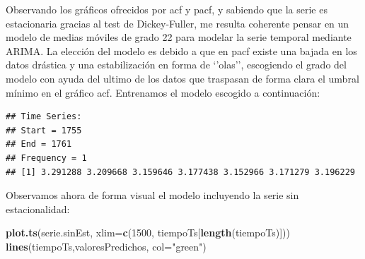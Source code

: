 \documentclass[]{article}
\newenvironment{Shaded}{\begin{snugshade}}{\end{snugshade}}
\newcommand{\KeywordTok}[1]{\textcolor[rgb]{0.13,0.29,0.53}{\textbf{#1}}}
\newcommand{\DataTypeTok}[1]{\textcolor[rgb]{0.13,0.29,0.53}{#1}}
\newcommand{\DecValTok}[1]{\textcolor[rgb]{0.00,0.00,0.81}{#1}}
\newcommand{\StringTok}[1]{\textcolor[rgb]{0.31,0.60,0.02}{#1}}
\newcommand{\CommentTok}[1]{\textcolor[rgb]{0.56,0.35,0.01}{\textit{#1}}}
\newcommand{\OperatorTok}[1]{\textcolor[rgb]{0.81,0.36,0.00}{\textbf{#1}}}
\newcommand{\NormalTok}[1]{#1}
\begin{document}
Observando los gráficos ofrecidos por acf y pacf, y sabiendo que la
serie es estacionaria gracias al test de Dickey-Fuller, me resulta
coherente pensar en un modelo de medias móviles de grado 22 para modelar
la serie temporal mediante ARIMA. La elección del modelo es debido a que
en pacf existe una bajada en los datos drástica y una estabilización en
forma de `'olas'', escogiendo el grado del modelo con ayuda del ultimo
de los datos que traspasan de forma clara el umbral mínimo en el gráfico
acf. Entrenamos el modelo escogido a continuación:

\begin{Shaded}
\end{Shaded}

\begin{verbatim}
## Time Series:
## Start = 1755 
## End = 1761 
## Frequency = 1 
## [1] 3.291288 3.209668 3.159646 3.177438 3.152966 3.171279 3.196229
\end{verbatim}

Observamos ahora de forma visual el modelo incluyendo la serie sin
estacionalidad:

\begin{Shaded}
\begin{Highlighting}[]
\KeywordTok{plot.ts}\NormalTok{(serie.sinEst, }\DataTypeTok{xlim=}\KeywordTok{c}\NormalTok{(}\DecValTok{1500}\NormalTok{, tiempoTs[}\KeywordTok{length}\NormalTok{(tiempoTs)])) }
\KeywordTok{lines}\NormalTok{(tiempoTs,valoresPredichos, }\DataTypeTok{col=}\StringTok{"green"}\NormalTok{)}
\end{Highlighting}
\end{Shaded}
\end{document}

